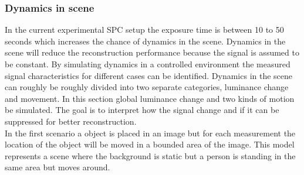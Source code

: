 \subsubsection{Dynamics in scene}
\label{sec:dyn_sim}
In the current experimental SPC setup the exposure time is between 10 to 50 seconds which increases the chance of dynamics in the scene. Dynamics in the scene will reduce the reconstruction performance because the signal is assumed to be constant. By simulating dynamics in a controlled environment the measured signal characteristics for different cases can be identified. Dynamics in the scene can roughly be roughly divided into two separate categories, luminance change and movement. In this section global luminance change and two kinds of motion be simulated. The goal is to interpret how the signal change and if it can be suppressed for better reconstruction.\\[0.1in]




In the first scenario a object is placed in an image but for each measurement the location of the object will be moved in a bounded area of the image. This model represents a scene where the background is static but a person is standing in the same area but moves around.



